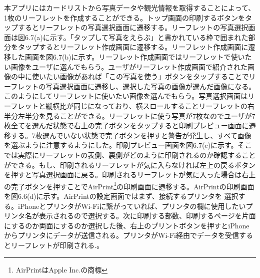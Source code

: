 本アプリにはカードリストから写真データや観光情報を取得することによって、1枚のリーフレットを作成することができる。トップ画面の印刷するボタンをタップするとリーフレットの写真選択画面に遷移する。リーフレットの写真選択画面は図6.7(a)に示す。「タップして写真をえらぶ」と書かれている枠で囲まれた部分をタップするとリーフレット作成画面に遷移する。リーフレット作成画面に遷移した画面を図6.7(b)に示す。リーフレット作成画面ではリーフレットで使いたい画像をユーザに選んでもらう。ユーザがリーフレット作成画面で紹介された画像の中に使いたい画像があれば「この写真を使う」ボタンをタップすることでリーフレットの写真選択画面に遷移し、選択した写真の画像が選んだ画像になる。このようにしてリーフレットに使いたい画像を選んでもらう。写真選択画面はリーフレットと縦横比が同じになっており、横スロールすることリーフレットの右半分左半分を見ることができる。リーフレットに使う写真が7枚なのでユーザが7枚全てを選んだ状態で右上の完了ボタンをタップすると印刷プレビュー画面に遷移する。7枚選んでいない状態で完了ボタンを押すと警告が発生し、すべて画像を選ぶように注意するようにした。印刷プレビュー画面を図6.7(c)に示す。そこでは実際にリーフレットの表側、裏側がどのように印刷されるのか確認することができる。もし、印刷されるリーフレットが気に入らなければ左上の戻るボタンを押すと写真選択画面に戻る。印刷されるリーフレットが気に入った場合は右上の完了ボタンを押すことでAirPrint\footnote{AirPrintはApple Inc.の商標}の印刷画面に遷移する。AirPrintの印刷画面を図6.6(d)に示す。AirPrintの設定画面ではまず、接続するプリンタを 選択する。iPhoneとプリンタがWi-Fiに繋がっていれば、プリンタの欄に使用したいプリンタ名が表示されるので選択する。次に印刷する部数、印刷するページを片面にするのか両面にするのか選択した後、右上のプリントボタンを押すとiPhoneからプリンタにデータが送信される。プリンタがWi-Fi経由でデータを受信するとリーフレットが印刷される.。
